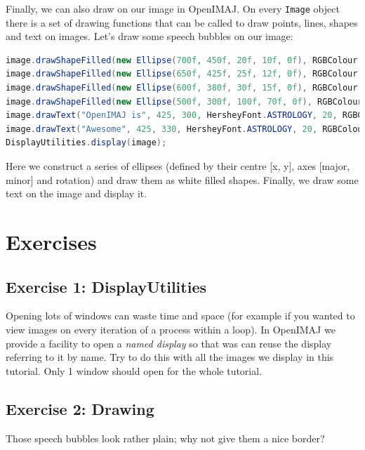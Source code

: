 Finally, we can also draw on our image in OpenIMAJ. On every \verb+Image+ object there is a 
set of drawing functions that can be called to draw points, lines, shapes and text on 
images. Let's draw some speech bubbles on our image:
\begin{lstlisting}[language=java]
image.drawShapeFilled(new Ellipse(700f, 450f, 20f, 10f, 0f), RGBColour.WHITE);
image.drawShapeFilled(new Ellipse(650f, 425f, 25f, 12f, 0f), RGBColour.WHITE);
image.drawShapeFilled(new Ellipse(600f, 380f, 30f, 15f, 0f), RGBColour.WHITE);
image.drawShapeFilled(new Ellipse(500f, 300f, 100f, 70f, 0f), RGBColour.WHITE);
image.drawText("OpenIMAJ is", 425, 300, HersheyFont.ASTROLOGY, 20, RGBColour.BLACK);
image.drawText("Awesome", 425, 330, HersheyFont.ASTROLOGY, 20, RGBColour.BLACK);
DisplayUtilities.display(image);
\end{lstlisting}
Here we construct a series of ellipses (defined by their centre [x, y], axes 
[major, minor] and rotation) and draw them as white filled shapes. Finally, we draw 
some text on the image and display it.

\section*{Exercises}
\subsection*{Exercise 1: DisplayUtilities}
Opening lots of windows can waste time and space (for example if you wanted to view images on every 
iteration of a process within a loop). In OpenIMAJ we provide a facility to open a 
\emph{named display} so that was can reuse the display referring to it by name. Try to do this with all the 
images we display in this tutorial. Only 1 window should open for the whole tutorial.
\subsection*{Exercise 2: Drawing}
Those speech bubbles look rather plain; why not give them a nice border?
